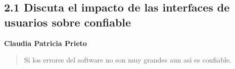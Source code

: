 \subsection*{2.1 Discuta el impacto de las interfaces de usuarios sobre confiable}
\textbf{Claudia Patricia Prieto}
\begin{quote}
Si los errores del software no son muy grandes aun asi es confiable.
\end{quote}
